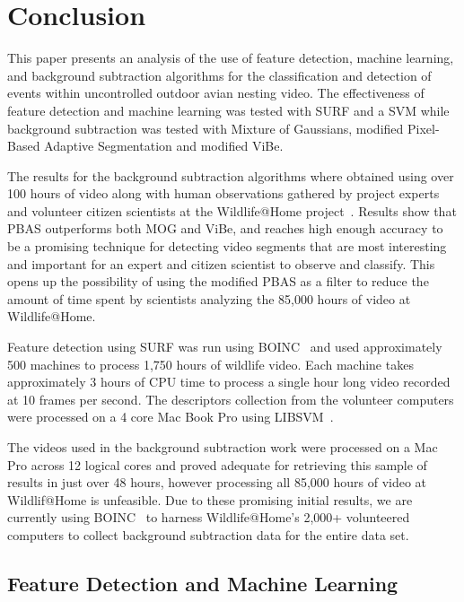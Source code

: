 \chapter{Conclusion}
\label{ch:conclusion}

This paper presents an analysis of the use of feature detection, machine learning, and background subtraction algorithms for the classification and detection of events within uncontrolled outdoor avian nesting video. The effectiveness of feature detection and machine learning was tested with SURF and a SVM while background subtraction was tested with Mixture of Gaussians, modified Pixel-Based Adaptive Segmentation and modified ViBe.

The results for the background subtraction algorithms where obtained using over 100 hours of video along with human observations gathered by project experts and volunteer citizen scientists at the Wildlife@Home project~\cite{desell_2013_wildlife,desell_iccs_wildlife_2015}. Results show that PBAS outperforms both MOG and ViBe, and reaches high enough accuracy to be a promising technique for detecting video segments that are most interesting and important for an expert and citizen scientist to observe and classify. This opens up the possibility of using the modified PBAS as a filter to reduce the amount of time spent by scientists analyzing the 85,000 hours of video at Wildlife@Home.

Feature detection using SURF was run using BOINC~\cite{anderson_2004_boinc} and used approximately 500 machines to process 1,750 hours of wildlife video. Each machine takes approximately 3 hours of CPU time to process a single hour long video recorded at 10 frames per second. The descriptors collection from the volunteer computers were processed on a 4 core Mac Book Pro using LIBSVM~\cite{chang_2011_libsvm}.

The videos used in the background subtraction work were processed on a Mac Pro across 12 logical cores and proved adequate for retrieving this sample of results in just over 48 hours, however processing all 85,000 hours of video at Wildlif@Home is unfeasible. Due to these promising initial results, we are currently using BOINC~\cite{anderson_2004_boinc} to harness Wildlife@Home's 2,000+ volunteered computers to collect background subtraction data for the entire data set.


\section{Feature Detection and Machine Learning}
\label{sec:conclusion_machine_learning}

